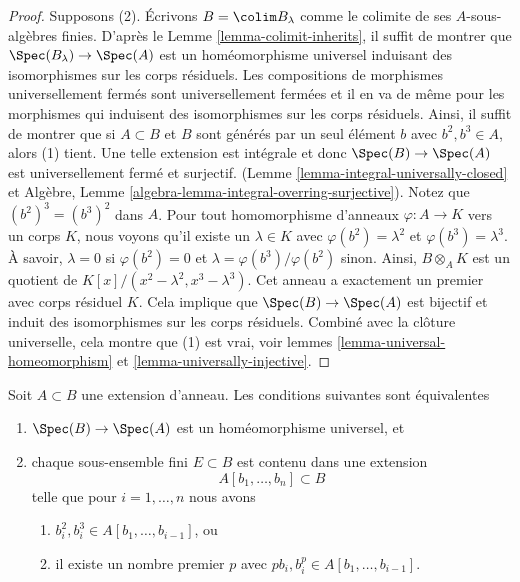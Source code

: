 \begin{proof}
\medskip\noindent
Supposons (2). Écrivons $B = \colim B_\lambda$ comme le colimite de ses $A$-sous-algèbres
finies.
D'après le Lemme \ref{lemma-colimit-inherits}, il suffit de montrer que $\Spec(B_\lambda) \to \Spec(A)$
est un homéomorphisme universel induisant
des isomorphismes sur les corps résiduels. Les compositions de
morphismes universellement fermés sont universellement fermées et il
en va de même pour les morphismes qui induisent des isomorphismes sur les corps résiduels.
Ainsi, il suffit de montrer que si $A \subset B$ et $B$ sont
générés par un seul élément $b$ avec $b^2, b^3 \in A$, alors
(1) tient. Une telle extension est intégrale et donc $\Spec(B) \to \Spec(A)$ est universellement
fermé et surjectif.
(Lemme \ref{lemma-integral-universally-closed} et Algèbre, Lemme \ref{algebra-lemma-integral-overring-surjective}).
Notez que $(b^2)^3 = (b^3)^2$ dans $A$. Pour
tout homomorphisme d'anneaux
$\varphi : A \to K$ vers un corps $K$, nous voyons qu'il
existe un $\lambda \in K$ avec $\varphi(b^2) = \lambda^2$ et $\varphi(b^3) = \lambda^3$.
À savoir, $\lambda = 0$ si $\varphi(b^2) = 0$ et $\lambda = \varphi(b^3)/\varphi(b^2)$ sinon.
Ainsi, $B \otimes_A K$ est un quotient de $K[x]/(x^2 - \lambda^2, x^3 - \lambda^3)$.
Cet anneau a exactement un premier avec corps résiduel
$K$. Cela implique que $\Spec(B) \to \Spec(A)$
est bijectif et induit des isomorphismes sur les
corps résiduels. Combiné avec la clôture universelle,
cela montre que (1) est vrai, voir lemmes \ref{lemma-universal-homeomorphism}
et \ref{lemma-universally-injective}.
\end{proof}

\begin{proposition}
\label{proposition-universal-homeomorphism}
Soit $A \subset B$ une extension d'anneau. Les conditions suivantes sont équivalentes
\begin{enumerate}
\item $\Spec(B) \to \Spec(A)$ est un homéomorphisme universel, et
\item chaque sous-ensemble fini $E \subset B$ est contenu dans une extension
$$
A[b_1, \ldots, b_n] \subset B
$$
telle que pour $i = 1, \ldots, n$ nous avons
\begin{enumerate}
\item $b_i^2, b_i^3 \in A[b_1, \ldots, b_{i - 1}]$, ou
\item il existe un nombre premier
$p$ avec $pb_i, b_i^p \in A[b_1, \ldots, b_{i - 1}]$.
\end{enumerate}
\end{enumerate}
\end{proposition}

